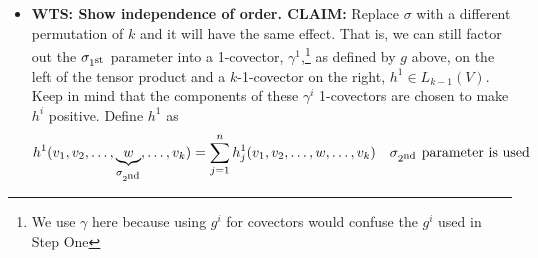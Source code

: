 \documentclass[10pt,a4paper]{report}
\begin{document}
\begin{enumerate}[label=3.\arabic*.]
{\begin{itemize}
\begin{align*}
		&= \sum_{i=1}^n v^i f(e_i, w, v_3, \dots, v_k) \\
		&= \sum_{i=1}^n \alpha^i(v) f(e_i, w, v_3, \dots, v_k) \\
		&= \sum_{i=1}^n \alpha^i(v) f\PAREN{e_i, \SUM{n=1}{n} w^je_j, v_3, \dots, v_k} \\
		&= \sum_{i=1}^n \alpha^i(v)\, \SUM{j=1}{n} w^j f\PAREN{e_i, e_j, v_3, \dots, v_k} \\
		&= \sum_{i=1}^n \alpha^i(v)\, \SUM{j=1}{n} \alpha^j(w) f\PAREN{e_i, e_j, v_3, \dots, v_k}
	\end{align*}once again, let $g \in L_1(V)$ and $g(v)=\SUM{i=1}{n} g^i \alpha^i(v)$  and this time $h \in L_{k-1}(V)$ and 
	\begin{align*}
		h(w, v_3, \cdots, v_k) &= \SUM{j=1}{n} h^j \alpha^j(w) f(e_i, e_j, v_3, \dots, v_k)\\h^j &= \frac{f(e_i, e_j, v_3, \dots, v_k)}{g^i}
	\end{align*}	 then
	\begin{align*}
		f(v, w, v_3, \dots, v_k) &= g(v)h(w,v_3,\dots,v_k) \\
		&= (g\otimes h)(v, w, v_3, \dots, v_k)
	\end{align*}
	\textbf{Step Four: }Steps One, Two and Three demonstrate that we can factor out a 1-covector and $k$-1-covector from any $k$-covector $f$ into a tensor product \textit{from the first parameter}.  By repeating this process \textbf{in sequence}, that is with identity permutation $\sigma = \{1, 2, \dots, k\}$, we can see that any $k$-covector can be factored into the tensor product of $k$ 1-covectors.\\ \\
	This proves that $\Phi$ is surjective over $L_k(V)$.\\
	\item \textbf{WTS: Show independence of order. CLAIM: } Replace $\sigma$ with a different permutation of $k$ and it will have the same effect.  That is, we can still factor out the $\sigma_{1\textsuperscript{st}}$ parameter into a 1-covector, $\gamma^1$,\footnote{We use $\gamma$ here because using $g^i$ for covectors would confuse the $g^i$ used in Step One} as defined by $g$ above, on the left of the tensor product and a $k$-1-covector on the right, $h^1 \in L_{k-1}(V)$. Keep in mind that the components of these $\gamma^i$ 1-covectors are chosen to make $h^i$ positive. Define $h^1$ as
	\begin{align*}
		h^1(v_1, v_2, \dots,\underbrace{w}_{\sigma_{2\SND}}, \dots, v_k) &= \sum_{j=1}^n h^1_j(v_1, v_2, \dots,w, \dots, v_k) & \sigma_{2\SND}\text{ parameter is used}\\

\end{align*}
\end{itemize}}
\end{enumerate}
\end{document}
